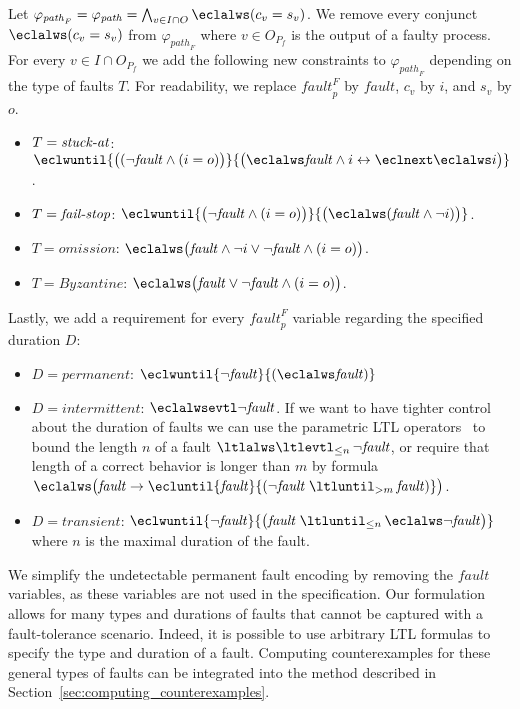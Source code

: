 \documentclass{LMCS}
\newcommand{\eclpuntil}   [3]{#2\;\ltluntil_{#1}\;\kern-.1em #3}
\theoremstyle{plain}\newtheorem{theorem}[thm]{Theorem}
\theoremstyle{plain}\newtheorem{lemma}[thm]{Lemma}
\theoremstyle{plain}\newtheorem{proposition}[thm]{Proposition}
\theoremstyle{plain}\newtheorem{corollary}[thm]{Corollary}
\theoremstyle{definition}\newtheorem{definition}{Definition}[section]
\begin{document}
Let $\varphi_{\mathit{path}_F} = \varphi_\mathit{path} = \bigwedge_{v \in I \cap O} \eclalws (c_v = s_v)$.
We remove every conjunct $\eclalws (c_v = s_v)$ from $\varphi_{\mathit{path}_F}$ where $v \in O_{P_f}$ is the output of a faulty process.
For every $v \in I \cap O_{P_f}$ we add the following new constraints to $\varphi_{\mathit{path}_F}$ depending on the type of faults $T$.
For readability, we replace $\mathit{fault}^F_p$ by $\mathit{fault}$, $c_v$ by $i$, and $s_v$ by $o$.
\begin{itemize}
  \item $T = \mathit{stuck\text{-}\hspace{-0.4pt}at}$: $\eclwuntil{\big((\neg\mathit{fault} \land (i = o)\big)}{\big( \eclalws \mathit{fault} \land i \leftrightarrow \eclnext\eclalws i \big)}$.
  \item $T = \mathit{fail\text{-}\hspace{-0.4pt}stop}$: $\eclwuntil{\big(\neg\mathit{fault} \land (i = o)\big)}{\big(\eclalws (\mathit{fault} \land \neg i)\big)}$.
  \item $T = \mathit{omission}$: $\eclalws \big(\mathit{fault} \land \neg i \lor \neg\mathit{fault} \land (i = o)\big)$.
  \item $T = \mathit{Byzantine}$: $\eclalws \big(\mathit{fault} \lor \neg\mathit{fault} \land (i = o)\big)$.
\end{itemize}
Lastly, we add a requirement for every $\mathit{fault}^F_p$ variable regarding the specified duration $D$:
\begin{itemize}
  \item $D = \mathit{permanent}$: $\eclwuntil{\neg \mathit{fault}}{(\eclalws \mathit{fault})}$
  \item $D = \mathit{intermittent}$: $\eclalwsevtl \neg\mathit{fault}$. If we want to have tighter control about the duration of faults we can use the parametric LTL operators~\cite{DBLP:journals/tocl/AlurETP01} to bound the length $n$ of a fault $\ltlalws\ltlevtl_{\leq n}\, \neg\mathit{fault}$, or require that length of a correct behavior is longer than $m$ by formula $\eclalws \big(\mathit{fault} \rightarrow \ecluntil{\mathit{fault}}{ (\eclpuntil{> m}{\neg\mathit{fault}}{\mathit{fault} }) } \big)$.
  \item $D = \mathit{transient}$: $\eclwuntil{\neg\mathit{fault}}{ \big(\eclpuntil{\leq n}{\mathit{fault}}{\eclalws \neg\mathit{fault} }\big) }$ where $n$ is the maximal duration of the fault.
\end{itemize}
We simplify the undetectable permanent fault encoding by removing the $\mathit{fault}$ variables, as these variables are not used in the specification.
Our formulation allows for many types and durations of faults that cannot be captured with a fault-tolerance scenario.
Indeed, it is possible to use arbitrary LTL formulas to specify the type and duration of a fault.
Computing counterexamples for these general types of faults can be integrated into the method described in Section~\ref{sec:computing_counterexamples}.
\end{document}
